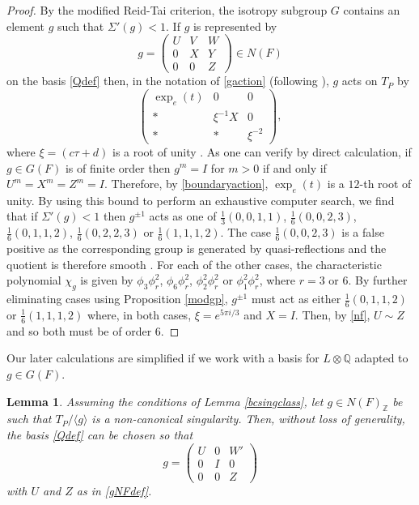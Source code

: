 \documentclass[12pt, a4paper]{article}
\newtheorem{lemma}[thm]{Lemma}
\newcommand{\ZZ}{\mathbb{Z}}
\newcommand{\QQ}{\mathbb{Q}}
\newcommand{\la}{\langle}
\newcommand{\ra}{\rangle}
\newcommand{\opn}{\operatorname}
\begin{document}
\begin{proof}
  By the modified Reid-Tai criterion, the isotropy subgroup $G$ contains an element $g$ such that $\Sigma'(g) <1$.
  If $g$ is represented by 
  \[
  g  =
  \begin{pmatrix}
    U & V & W \\
    0 & X & Y \\
    0 & 0 & Z
  \end{pmatrix} \in N(F)
  \]
  on the basis \eqref{Qdef} then, in the notation of \eqref{gaction} (following \cite[(8.2), p.292]{Kondo}), $g$ acts on $T_P$ by
  \begin{equation}\label{boundaryaction}
  \begin{pmatrix}
    \opn{exp}_e(t) & 0 & 0 \\
    * & \xi^{-1} X & 0 \\
    * & * & \xi^{-2} 
  \end{pmatrix},
  \end{equation}
  where $\xi = (c \tau + d)$ is a root of unity \cite[Proposition 2.28]{GHSK3}. 
As one can verify by direct calculation, if $g \in G(F)$ is of finite order then $g^m=I$ for $m>0$ if and only if $U^m=X^m=Z^m=I$.
  Therefore, by \eqref{boundaryaction}, $\opn{exp}_e(t)$ is a $12$-th root of unity.
By using this bound to perform an exhaustive computer search, we find that if $\Sigma'(g)<1$ then $g^{\pm 1}$ acts as one of
  $\frac{1}{3}(0,0,1,1)$,
  $\frac{1}{6}(0,0,2,3)$,
  $\frac{1}{6}(0,1,1,2)$,
  $\frac{1}{6}(0,2,2,3)$ or
  $\frac{1}{6}(1,1,1,2)$.
  The case $\frac{1}{6}(0,0,2,3)$ is a false positive as the corresponding group is generated by quasi-reflections and the quotient is therefore smooth \cite{Chevalley}.
  For each of the other cases, the characteristic polynomial $\chi_g$ is given by
  $\phi_3 \phi_r^2$,
  $\phi_6 \phi_r^2$,
  $\phi_2^2 \phi_r^2$ or
  $\phi_1^2 \phi_r^2$,
  where $r = 3$ or $6$.
  By further eliminating cases using Proposition \ref{modgp}, $g^{\pm 1}$ must act as either 
  $\frac{1}{6}(0,1,1,2)$
  or
  $\frac{1}{6}(1,1,1,2)$
  where, in both cases, $\xi=e^{5 \pi i/3}$ and $X=I$. 
  Then, by \eqref{nf}, $U \sim Z$ and so both must be of order 6.
\end{proof}
Our later calculations are simplified if we work with a basis for $L \otimes \QQ$ adapted to $g \in G(F)$.
\begin{lemma}\label{bcsplitlem}
  Assuming the conditions of Lemma \ref{bcsingclass}, let $g \in N(F)_{\ZZ}$ be such that $T_P / \la g \ra$  is a non-canonical singularity. 
  Then, without loss of generality, the basis \eqref{Qdef} can be chosen so that 
  \[
  g =
  \begin{pmatrix}
    U & 0 & W' \\
    0 & I & 0 \\
    0 & 0 & Z
  \end{pmatrix}
  \]
  with $U$ and $Z$ as in \eqref{gNFdef}.
\end{lemma}
\end{document}
